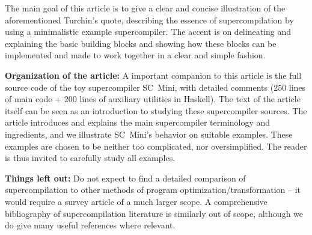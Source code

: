 The main goal of this article is to give a clear and concise illustration of the
aforementioned Turchin's quote, describing the essence of supercompilation
by using a minimalistic example supercompiler.
The accent is on delineating and explaining the basic building blocks
and showing how these blocks can be implemented and made to work together
in a clear and simple fashion.

\textbf{Organization of the article:}
A important companion to this article is the full source code of the toy supercompiler
SC~Mini, with detailed comments \cite{ScMiniAppendix}
(250 lines of main code + 200 lines of auxiliary utilities in Haskell).
The text of the article itself can be seen as an introduction to studying
these supercompiler sources.
The article introduces and explains the main supercompiler terminology and ingredients,
and we illustrate SC~Mini's behavior on suitable examples.
These examples are chosen to be neither too complicated, nor oversimplified.
The reader is thus invited to carefully study all examples.


\textbf{Things left out:} 
Do not expect to find a detailed comparison of supercompilation to other methods
of program optimization/transformation -- it would require a survey article
of a much larger scope. 
A comprehensive bibliography of supercompilation literature is similarly out of scope,
although we do give many useful references where relevant.

